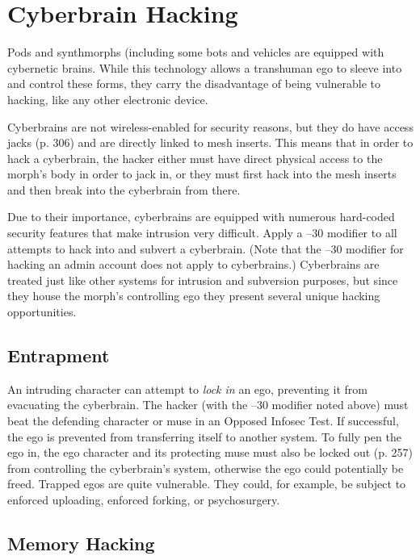 \section{Cyberbrain Hacking}

Pods and synthmorphs (including some bots and vehicles
are equipped with cybernetic brains. While this
technology allows a transhuman ego to sleeve into and 
control these forms, they carry the disadvantage of being 
vulnerable to hacking, like any other electronic device.

Cyberbrains are not wireless-enabled for security 
reasons, but they do have access jacks (p. 306) and 
are directly linked to mesh inserts. This means that 
in order to hack a cyberbrain, the hacker either must 
have direct physical access to the morph's body in 
order to jack in, or they must first hack into the mesh 
inserts and then break into the cyberbrain from there.

Due to their importance, cyberbrains are equipped 
with numerous hard-coded security features that make 
intrusion very difficult. Apply a –30 modifier to all 
attempts to hack into and subvert a cyberbrain. (Note 
that the –30 modifier for hacking an admin account 
does not apply to cyberbrains.)
Cyberbrains are treated just like other systems for 
intrusion and subversion purposes, but since they 
house the morph's controlling ego they present several 
unique hacking opportunities.

\subsection{Entrapment}

An intruding character can attempt to \textit{lock in} an ego, 
preventing it from evacuating the cyberbrain. The 
hacker (with the –30 modifier noted above) must 
beat the defending character or muse in an Opposed 
Infosec Test. If successful, the ego is prevented from 
transferring itself to another system.
To fully pen the ego in, the ego character and its 
protecting muse must also be locked out (p. 257) from 
controlling the cyberbrain's system, otherwise the ego 
could potentially be freed.
 Trapped egos are quite vulnerable. They could, for 
example, be subject to enforced uploading, enforced 
forking, or psychosurgery.

\subsection{Memory Hacking}

